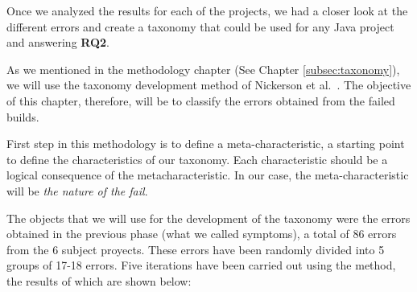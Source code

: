 Once we analyzed the results for each of the projects, we had a closer look at the different errors and create a taxonomy that could be used for any Java project and answering \textbf{RQ2}.

As we mentioned in the methodology chapter (See Chapter \ref{subsec:taxonomy}), we will use the taxonomy development method of Nickerson et al.~\cite{Nickerson2013}. The objective of this chapter, therefore, will be to classify the errors obtained from the failed builds.

First step in this methodology is to define a meta-characteristic, a starting point to define the characteristics of our taxonomy. Each characteristic should be a logical consequence of the metacharacteristic. In our case, the meta-characteristic will be \textit{the nature of the fail}. 

The objects that we will use for the development of the taxonomy were the errors obtained in the previous phase (what we called symptoms), a total of 86 errors from the 6 subject proyects. These errors have been randomly divided into 5 groups of 17-18 errors. Five iterations have been carried out using the method, the results of which are shown below:

